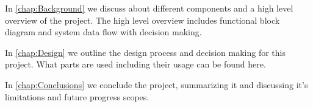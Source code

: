 In \autoref{chap:Background} we discuss about different components and a high level overview of the project. The high level overview
includes functional block diagram and system data flow with decision making. 

In \autoref{chap:Design} we outline the design process and decision making for this project. What parts are used 
including their usage can be found here.

In \autoref{chap:Conclusions} we conclude the project, summarizing it and discussing it's limitations and future 
progress scopes. 
